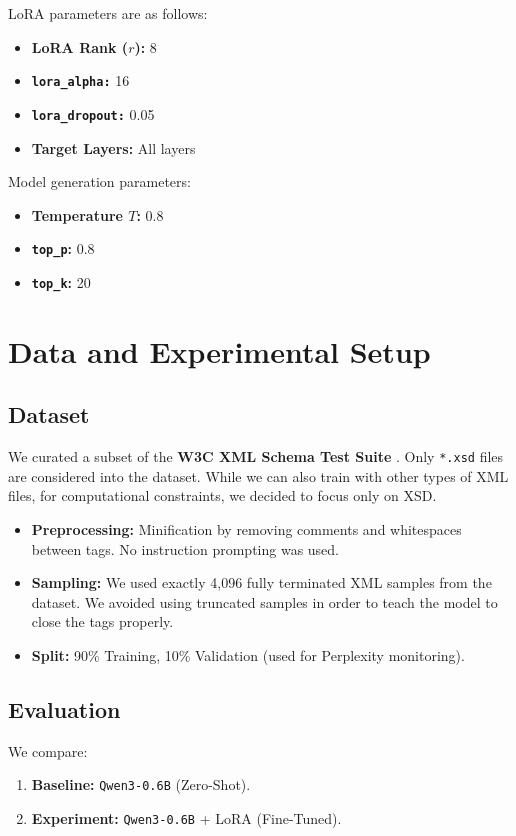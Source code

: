 \documentclass[11pt]{article}
\begin{document}
LoRA parameters are as follows:

\begin{itemize}
    \item \textbf{LoRA Rank ($r$):} 8
    \item \textbf{\texttt{lora\_alpha:}} 16
    \item \textbf{\texttt{lora\_dropout:}} 0.05
    \item \textbf{Target Layers:} All layers
\end{itemize}

Model generation parameters:

\begin{itemize}
    \item \textbf{Temperature $T$:} 0.8
    \item \textbf{\texttt{top\_p}:} 0.8
    \item \textbf{\texttt{top\_k}:} 20
\end{itemize}

\section{Data and Experimental Setup}

\subsection{Dataset}
We curated a subset of the \textbf{W3C XML Schema Test Suite} \cite{xmlschema}. Only \texttt{*.xsd} files are considered into the dataset. While we can also train with other types of XML files, for computational constraints, we decided to focus only on XSD.
\begin{itemize}
    \item \textbf{Preprocessing:} Minification by removing comments and whitespaces between tags. No instruction prompting was used.
    \item \textbf{Sampling:} We used exactly 4,096 fully terminated XML samples from the dataset. We avoided using truncated samples in order to teach the model to close the tags properly.
    \item \textbf{Split:} 90\% Training, 10\% Validation (used for Perplexity monitoring).
\end{itemize}

\subsection{Evaluation}
We compare:
\begin{enumerate}
    \item \textbf{Baseline:} \texttt{Qwen3-0.6B} (Zero-Shot).
    \item \textbf{Experiment:} \texttt{Qwen3-0.6B} + LoRA (Fine-Tuned).
\end{enumerate}
\end{document}
